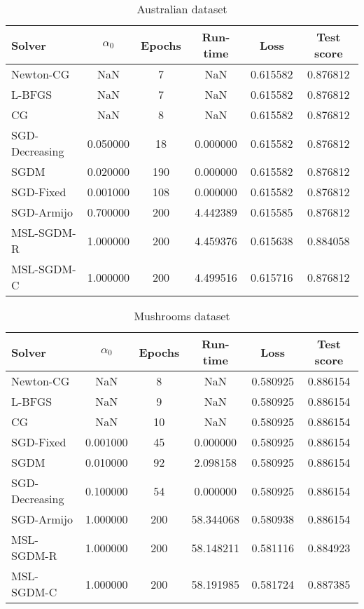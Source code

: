 \begin{table}
\caption{Australian dataset}
\label{tab:austr-tab}
\centering
\begin{tabular}{lS[round-precision=3]S[drop-zero-decimal]S[round-precision=4]S[round-precision=6]S[round-precision=4]}
\toprule
Solver & {$\alpha_0$} & {Epochs} & {Run-time} & {Loss} & {Test score} \\
\midrule
Newton-CG & NaN & 7 & NaN & 0.615582 & 0.876812 \\
L-BFGS & NaN & 7 & NaN & 0.615582 & 0.876812 \\
CG & NaN & 8 & NaN & 0.615582 & 0.876812 \\
SGD-Decreasing & 0.050000 & 18 & 0.000000 & 0.615582 & 0.876812 \\
SGDM & 0.020000 & 190 & 0.000000 & 0.615582 & 0.876812 \\
SGD-Fixed & 0.001000 & 108 & 0.000000 & 0.615582 & 0.876812 \\
SGD-Armijo & 0.700000 & 200 & 4.442389 & 0.615585 & 0.876812 \\
MSL-SGDM-R & 1.000000 & 200 & 4.459376 & 0.615638 & 0.884058 \\
MSL-SGDM-C & 1.000000 & 200 & 4.499516 & 0.615716 & 0.876812 \\
\bottomrule
\end{tabular}
\end{table}


\begin{table}
\caption{Mushrooms dataset}
\label{tab:mush-tab}
\centering
\begin{tabular}{lS[round-precision=3]S[drop-zero-decimal]S[round-precision=4]S[round-precision=6]S[round-precision=4]}
\toprule
Solver & {$\alpha_0$} & {Epochs} & {Run-time} & {Loss} & {Test score} \\
\midrule
Newton-CG & NaN & 8 & NaN & 0.580925 & 0.886154 \\
L-BFGS & NaN & 9 & NaN & 0.580925 & 0.886154 \\
CG & NaN & 10 & NaN & 0.580925 & 0.886154 \\
SGD-Fixed & 0.001000 & 45 & 0.000000 & 0.580925 & 0.886154 \\
SGDM & 0.010000 & 92 & 2.098158 & 0.580925 & 0.886154 \\
SGD-Decreasing & 0.100000 & 54 & 0.000000 & 0.580925 & 0.886154 \\
SGD-Armijo & 1.000000 & 200 & 58.344068 & 0.580938 & 0.886154 \\
MSL-SGDM-R & 1.000000 & 200 & 58.148211 & 0.581116 & 0.884923 \\
MSL-SGDM-C & 1.000000 & 200 & 58.191985 & 0.581724 & 0.887385 \\
\bottomrule
\end{tabular}
\end{table}



